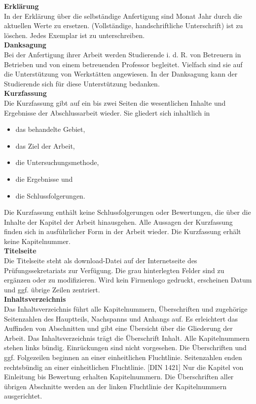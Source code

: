 \textbf{Erklärung}\\
In der Erklärung über die selbständige Anfertigung sind Monat Jahr durch die aktuellen Werte zu ersetzen. (Vollständige, handschriftliche Unterschrift) ist zu löschen. Jedes Exemplar ist zu unterschreiben. \\

\textbf{Danksagung}\\ 
Bei der Anfertigung ihrer Arbeit werden Studierende i. d. R. von Betreuern in Betrieben und von einem betreuenden Professor begleitet. Vielfach sind sie auf die Unterstützung von Werkstätten angewiesen. In der Danksagung kann der Studierende sich für diese Unterstützung bedanken.  \\

\textbf{Kurzfassung}\\ 
Die Kurzfassung gibt auf ein bis zwei Seiten die wesentlichen Inhalte und Ergebnisse der Abschlussarbeit wieder. Sie gliedert sich inhaltlich in 
\begin{itemize}
\item das behandelte Gebiet, 
\item das Ziel der Arbeit, 
\item die Untersuchungsmethode,  
\item die Ergebnisse und 
\item die Schlussfolgerungen.
\end{itemize}

Die Kurzfassung enthält keine Schlussfolgerungen oder Bewertungen, die über die Inhalte der Kapitel der Arbeit hinausgehen. Alle Aussagen der Kurzfassung finden sich in ausführlicher Form in der Arbeit wieder. Die Kurzfassung erhält keine Kapitelnummer. \\

\textbf{Titelseite}\\
Die Titelseite steht als download-Datei auf der Internetseite des Prüfungssekretariats zur 
Verfügung. Die grau hinterlegten Felder sind zu ergänzen oder zu modifizieren. Wird kein 
Firmenlogo gedruckt, erscheinen Datum und ggf. übrige Zeilen zentriert.\\

\textbf{Inhaltsverzeichnis}\\
Das Inhaltsverzeichnis führt alle Kapitelnummern, Überschriften und zugehörige Seitenzahlen des Hauptteils, Nachspanns und Anhangs auf. Es erleichtert das Auffinden von Abschnitten und gibt eine Übersicht über die Gliederung der Arbeit. Das Inhaltsverzeichnis trägt die Überschrift \glq Inhalt\grq{}. Alle Kapitelnummern stehen links bündig. Einrückungen sind nicht vorgesehen. Die Überschriften und ggf. Folgezeilen beginnen an einer einheitlichen Fluchtlinie. Seitenzahlen enden rechtsbündig an einer einheitlichen Fluchtlinie. [DIN 1421] Nur die Kapitel von Einleitung bis Bewertung erhalten Kapitelnummern. Die Überschriften aller übrigen Abschnitte werden an der linken Fluchtlinie der Kapitelnummern ausgerichtet. \\

